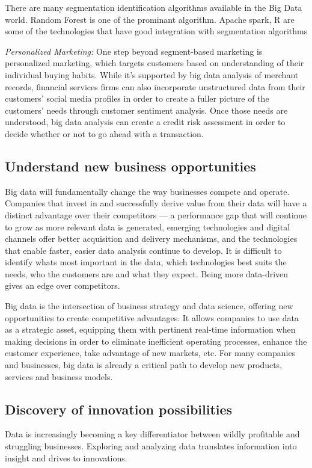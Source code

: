 \documentclass[sigconf]{acmart}
\begin{document}
There are many segmentation identification algorithms available in the Big Data world.  Random Forest is one of the prominant algorithm. Apache spark, R are some of the technologies that have good integration with segmentation algorithms

\textit{Personalized Marketing:} One step beyond segment-based marketing is personalized marketing, which targets customers based on understanding of their individual buying habits. While it’s  supported by big data analysis of merchant records, financial services firms can also incorporate unstructured data from their customers' social media profiles in order to create a fuller picture of the customers' needs through customer sentiment analysis. Once those needs are understood, big data analysis can create a credit risk assessment in order to decide whether or not to go ahead with a transaction\cite{5-big-data-use-cases-in-banking-and-financial-services}.

    
\subsection{Understand new business opportunities}
Big data will fundamentally change the way businesses
compete and operate. Companies that invest in and
successfully derive value from their data will have a distinct advantage over their competitors — a performance gap that will continue to grow as more relevant data is generated, emerging technologies and digital channels offer better acquisition and delivery mechanisms, and the technologies that enable faster, easier data analysis continue to develop. It is difficult to identify whats most important in the data, which technologies best suits the needs, who the customers are and what they expect. Being more data-driven gives an edge over competitors\cite{bigdata-ey}.

Big data is the intersection of business strategy and data science, offering new opportunities to create competitive advantages. It allows companies to use data as a strategic asset, equipping them with pertinent real-time information when making decisions in order to eliminate inefficient operating processes, enhance the customer experience, take advantage of new markets, etc.
For many companies and businesses, big data is already a critical path to develop new products, services and business models\cite{Accenture-Next-Generation-Financial}.

\subsection{Discovery of innovation possibilities}
Data is increasingly becoming a key differentiator between wildly profitable and struggling businesses. Exploring and analyzing data translates information into insight and drives to innovations\cite{bigdata-innovations}.
\end{document}

